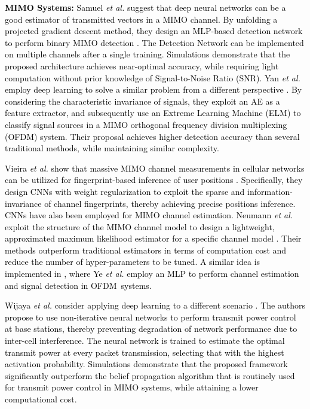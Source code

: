 \documentclass[journal,comsoc,letter]{IEEEtran}
\newcommand{\edit}[1]{\textcolor{black}{#1}}
\begin{document}
\noindent\edit{\textbf{MIMO Systems:} Samuel \emph{et al.} suggest that deep neural networks can be a good estimator of transmitted vectors in a MIMO channel. By unfolding a projected gradient descent method, they design an MLP-based detection network to perform binary MIMO detection \cite{samuel2017deep}. The Detection Network can be implemented on multiple channels after a single training. Simulations demonstrate that the proposed architecture achieves near-optimal accuracy, while requiring light computation without prior knowledge of Signal-to-Noise Ratio (SNR). Yan \emph{et al.} employ deep learning to solve a similar problem from a different perspective \cite{yan2017signal}. By considering the characteristic invariance of signals, they exploit an AE as a feature extractor, and subsequently use an Extreme Learning Machine (ELM) to classify signal sources in a MIMO orthogonal frequency division multiplexing (OFDM) system. Their proposal achieves higher detection accuracy than several traditional methods, while maintaining similar complexity.}

\edit{
Vieira \emph{et al.} show that massive MIMO channel measurements in cellular networks can be utilized for fingerprint-based inference of user positions \cite{vieira2017deep}. Specifically, they design CNNs with weight regularization to exploit the sparse and information-invariance of channel fingerprints, thereby achieving precise positions inference.  CNNs have also been employed for MIMO channel estimation. Neumann \emph{et al.} exploit the structure of the MIMO channel model to design a lightweight, approximated maximum likelihood estimator for a specific channel model \cite{neumann2017deep}. Their methods outperform traditional estimators in terms of computation cost and reduce the number of hyper-parameters to be tuned. A similar idea is implemented in \cite{ye2018power}, where Ye \emph{et al.} employ an MLP to perform channel estimation and signal detection in \mbox{OFDM systems.}}

\edit{
Wijaya \emph{et al.} consider applying deep learning to a different scenario \cite{wijaya2015intercell, wijaya2016neural}. The authors propose to use non-iterative neural networks to perform transmit power control at base stations, thereby preventing degradation of network performance due to inter-cell interference. The neural network is trained to estimate the optimal transmit power at every packet transmission, selecting that with the highest activation probability. Simulations demonstrate that the proposed framework significantly outperform the belief propagation algorithm that is routinely used for transmit power control in MIMO systems, while attaining a lower computational cost.}
\end{document}
